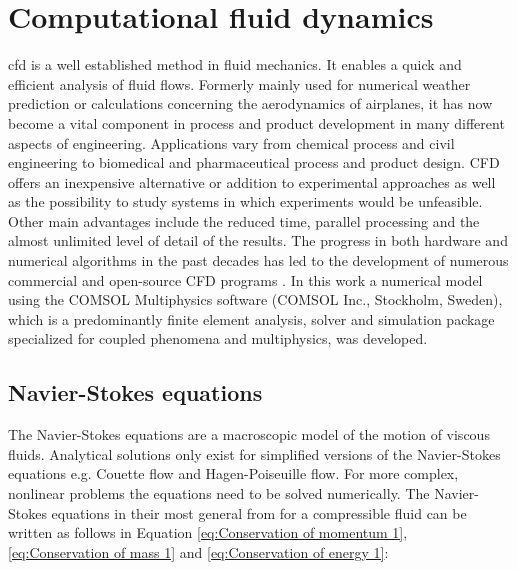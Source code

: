\section{Computational fluid dynamics}
\label{sec:CFD}
\Gls{cfd} is a well established method in fluid mechanics. It enables a quick and efficient analysis of fluid flows. Formerly mainly used for numerical weather prediction or calculations concerning the aerodynamics of airplanes, it has now become a vital component in process and
product development in many different aspects of engineering. Applications vary from chemical process and civil engineering to biomedical and pharmaceutical
process and product design. CFD offers an inexpensive alternative or addition to experimental approaches as well as the possibility to study systems in which experiments would be unfeasible. Other main advantages include the reduced time, parallel processing and the almost unlimited level of detail of the results. The progress in both hardware and numerical algorithms in the past decades has led to the development of numerous commercial and open-source CFD programs \cite{ghia1982high}. In this work a numerical model using the COMSOL Multiphysics  software (COMSOL Inc., Stockholm, Sweden), which is a predominantly finite element analysis, solver and simulation package specialized for coupled phenomena and multiphysics, was developed.

\subsection{Navier-Stokes equations}
\label{subsec:Navier_Stokes}
The Navier-Stokes equations are a macroscopic model of the motion of viscous fluids. Analytical solutions only exist for simplified versions of the Navier-Stokes equations e.g. Couette flow and Hagen-Poiseuille flow. For more complex, nonlinear problems the equations need to be solved numerically. The Navier-Stokes equations in their most general from for a compressible fluid can be written as follows in Equation \ref{eq:Conservation of momentum 1}, \ref{eq:Conservation of mass 1} and \ref{eq:Conservation of energy 1}:


